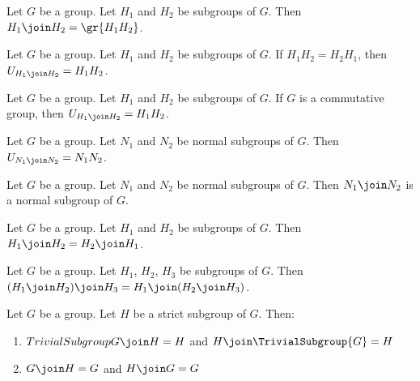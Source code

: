 \begin{theorem}
Let $G$ be a group.
Let $H_{1}$ and $H_{2}$ be subgroups of $G$.
Then $H_{1}\join H_{2}=\gr{H_{1}H_{2}}$.
\end{theorem}

\begin{theorem}
Let $G$ be a group.
Let $H_{1}$ and $H_{2}$ be subgroups of $G$.
If $H_{1}H_{2}=H_{2}H_{1}$, then $U_{H_{1}\join H_{2}}=H_{1}H_{2}$.
\end{theorem}

\begin{theorem}
Let $G$ be a group.
Let $H_{1}$ and $H_{2}$ be subgroups of $G$.
If $G$ is a commutative group, then $U_{H_{1}\join H_{2}}=H_{1}H_{2}$.
\end{theorem}

\begin{theorem}
Let $G$ be a group.
Let $N_{1}$ and $N_{2}$ be normal subgroups of $G$.
Then $U_{N_{1}\join N_{2}}=N_{1}N_{2}$.
\end{theorem}

\begin{theorem}
Let $G$ be a group.
Let $N_{1}$ and $N_{2}$ be normal subgroups of $G$.
Then $N_{1}\join N_{2}$ is a normal subgroup of $G$.
\end{theorem}

\begin{theorem}
Let $G$ be a group.
Let $H_{1}$ and $H_{2}$ be subgroups of $G$.
Then $H_{1}\join H_{2}=H_{2}\join H_{1}$.
\end{theorem}

\begin{theorem}
Let $G$ be a group.
Let $H_{1}$, $H_{2}$, $H_{3}$ be subgroups of $G$.
Then $(H_{1}\join H_{2})\join H_{3}=H_{1}\join(H_{2}\join H_{3})$.
\end{theorem}

\begin{theorem}
Let $G$ be a group.
Let $H$ be a strict subgroup of $G$.
Then:
\begin{enumerate}
\item{} $TrivialSubgroup{G}\join H=H$ and $H\join\TrivialSubgroup{G}=H$
\item{} $G\join H=G$ and $H\join G=G$
\end{enumerate}
\end{theorem}


